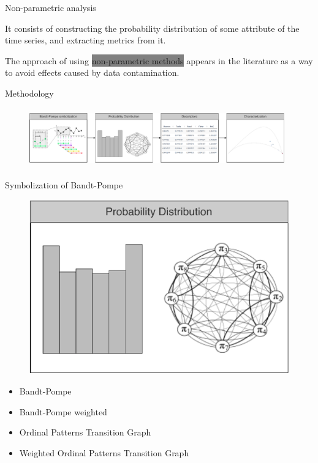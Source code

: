 \documentclass[10pt]{beamer}
\begin{document}
\begin{frame}{Non-parametric analysis}
    
    It consists of constructing the probability distribution of some attribute of the time series, and extracting metrics from it.
    
    \vspace{0.8cm}
    
    The approach of using \colorbox{gray}{non-parametric methods} appears in the literature as a way to avoid effects caused by data contamination.

\end{frame}

\begin{frame}{Methodology}

    \begin{figure}
       \includegraphics[width = 11cm,height = 2.6cm]{Figures/methodologyNATS.pdf}
    \end{figure}

\end{frame}

\begin{frame}{Symbolization of Bandt-Pompe}

    \begin{figure}
       \includegraphics[scale = 0.7]{Figures/symbolization.pdf}
    \end{figure}

    \begin{itemize}
        \item Bandt-Pompe
        \item Bandt-Pompe weighted
        \item Ordinal Patterns Transition Graph
        \item Weighted Ordinal Patterns Transition Graph
    \end{itemize}

\end{frame}
\end{document}
